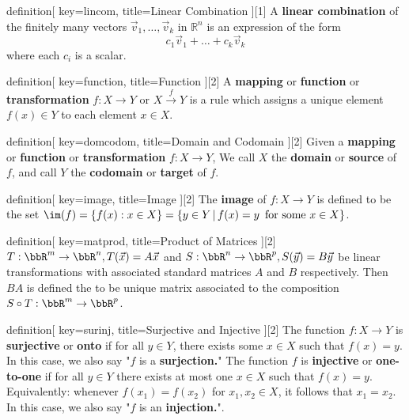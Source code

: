 \begin{SaveConcept}{definition}[
		key=lincom,
		title={Linear Combination}
	][1]
        A {\bf linear combination} of the finitely many vectors $\vec v_1, \dots, \vec v_k$ in $\mathbb R^n$ is an expression of the form 
	$$
	c_1 \vec v_1 + \dots + c_k \vec v_k
	$$
	where each $c_i$ is a scalar. 
\end{SaveConcept}


\begin{SaveConcept}{definition}[
		key=function,
		title={Function}
	][2]
	A {\bf mapping} or {\bf function} or {\bf transformation} $f:X \longrightarrow Y$ or $X \overset{f}\rightarrow Y$ is a rule which assigns a unique element $f(x)\in Y$ to each element $x \in X$.
\end{SaveConcept}


\begin{SaveConcept}{definition}[
		key=domcodom,
		title={Domain and Codomain}
	][2]
	Given a {\bf mapping} or {\bf function} or {\bf transformation} $f:X \longrightarrow Y$,  We call $X$ the {\bf domain} or {\bf source}  of $f$, and call $Y$ the {\bf codomain} or {\bf target} of $f$.
\end{SaveConcept}


\begin{SaveConcept}{definition}[
		key=image,
		title={Image}
	][2]
	The {\bf image} of $f:X\to Y$ is defined to be the set $\im(f) = \{ f(x): x \in X\}=\{ y \in Y \, | \, f(x) = y \, \text{ for  some } x\in X\}$.
\end{SaveConcept}

\begin{SaveConcept}{definition}[
		key=matprod,
		title={Product of Matrices}
	][2]
        $T:\bbR^m\rightarrow\bbR^n, T(\vec x)=A\vec x$ and $S:\bbR^n\rightarrow\bbR^p, S(\vec y)=B\vec y$ be linear transformations with associated standard matrices $A$ and $B$ respectively. Then   $BA$ is defined the to be unique matrix associated to the composition $S\circ T: \bbR^m\rightarrow \bbR^p$.
\end{SaveConcept}




\begin{SaveConcept}{definition}[
		key=surinj,
		title={Surjective and Injective}
	][2]
	The function  $f:X\to Y$ is {\bf surjective} or {\bf onto} if  for all $y \in Y$, there exists some $x\in X$ such that $f(x) = y$. In this case, we also say "$f$ is a  {\bf surjection.}"
        The function  $f$ is {\bf injective} or {\bf one-to-one} if for all $y \in Y$ there exists at most one $x \in X$ such that $f(x) = y$. Equivalently: whenever $f(x_1) = f(x_2)$ for $x_1, x_2 \in X$, it follows that $x_1 = x_2$. In this case, we also say "$f$ is an {\bf injection.}".
\end{SaveConcept}


